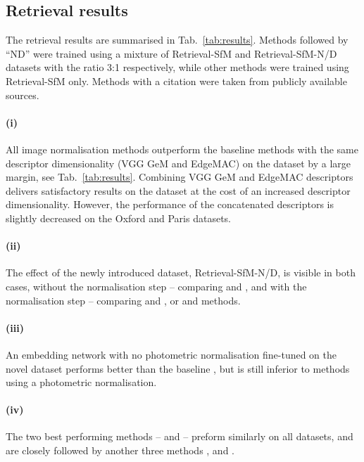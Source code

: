 \begin{figure*}
\subsection{Retrieval results}
The retrieval results are summarised in Tab.~\ref{tab:results}. Methods followed by ``ND'' were trained using a mixture of Retrieval-SfM and Retrieval-SfM-N/D datasets with the ratio 3:1 respectively, while other methods were trained using Retrieval-SfM only. Methods with a citation were taken from publicly available sources.

\paragraph{(i)} All image normalisation methods outperform the baseline methods with the same descriptor dimensionality (VGG GeM and EdgeMAC) on the \Tokyo dataset by a large margin, see Tab.~\ref{tab:results}. 
Combining VGG GeM and EdgeMAC descriptors delivers satisfactory results on the \Tokyo dataset at the cost of an increased descriptor dimensionality. However, the performance of the concatenated descriptors is slightly decreased on the Oxford and Paris datasets. 

\paragraph{(ii)} The effect of the newly introduced dataset, Retrieval-SfM-N/D, is visible in both cases, without the normalisation step -- comparing  and , and with the normalisation step -- comparing  and , or  and  methods.

\paragraph{(iii)} An embedding network with no photometric normalisation fine-tuned on the novel dataset  performs better than the baseline , but is still inferior to methods using a photometric normalisation.

\paragraph{(iv)} The two best performing methods --  and  -- preform similarly on all datasets, and are closely followed by another three methods ,  and .


\end{figure*}
